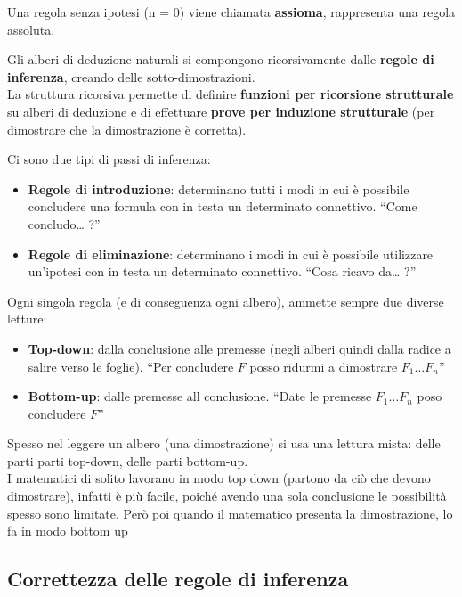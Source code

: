 \documentclass[
  a4paper,
]{article}
\providecommand{\tightlist}{%
  \setlength{\itemsep}{0pt}\setlength{\parskip}{0pt}}
\begin{document}
Una regola senza ipotesi (n = 0) viene chiamata \textbf{assioma},
rappresenta una regola assoluta.

Gli alberi di deduzione naturali si compongono ricorsivamente dalle
\textbf{regole di inferenza}, creando delle sotto-dimostrazioni.\\
La struttura ricorsiva permette di definire \textbf{funzioni per
ricorsione strutturale} su alberi di deduzione e di effettuare
\textbf{prove per induzione strutturale} (per dimostrare che la
dimostrazione è corretta).

Ci sono due tipi di passi di inferenza:

\begin{itemize}
\tightlist
\item
  \textbf{Regole di introduzione}: determinano tutti i modi in cui è
  possibile concludere una formula con in testa un determinato
  connettivo. ``Come concludo\ldots{} ?''
\item
  \textbf{Regole di eliminazione}: determinano i modi in cui è possibile
  utilizzare un'ipotesi con in testa un determinato connettivo. ``Cosa
  ricavo da\ldots{} ?''
\end{itemize}

Ogni singola regola (e di conseguenza ogni albero), ammette sempre due
diverse letture:

\begin{itemize}
\tightlist
\item
  \textbf{Top-down}: dalla conclusione alle premesse (negli alberi
  quindi dalla radice a salire verso le foglie). ``Per concludere \(F\)
  posso ridurmi a dimostrare \(F_1 \dots F_n\)''
\item
  \textbf{Bottom-up}: dalle premesse all conclusione. ``Date le premesse
  \(F_1 \dots F_n\) poso concludere \(F\)''
\end{itemize}

Spesso nel leggere un albero (una dimostrazione) si usa una lettura
mista: delle parti parti top-down, delle parti bottom-up.\\
I matematici di solito lavorano in modo top down (partono da ciò che
devono dimostrare), infatti è più facile, poiché avendo una sola
conclusione le possibilità spesso sono limitate. Però poi quando il
matematico presenta la dimostrazione, lo fa in modo bottom up

\hypertarget{correttezza-delle-regole-di-inferenza}{%
\subsection{Correttezza delle regole di
inferenza}\label{correttezza-delle-regole-di-inferenza}}
\end{document}

